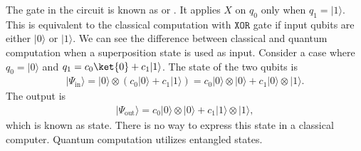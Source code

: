 \documentclass[letterpaper,10pt,english]{jupyterBook}
\begin{document}
\sphinxAtStartPar
The gate in the circuit is known as  or .  It applies \(X\) on \(q_0\) only when \(q_1 = \lvert 1 \rangle\). This is equivalent to the classical computation with \(\texttt{XOR}\) gate if input qubits are either \(\lvert 0 \rangle\) or \(\lvert 1 \rangle\).   We can see the difference between classical and quantum computation  when a superposition state is used as input. Consider a case where \(q_0=\lvert 0 \rangle\) and \(q_1=c_0 \ket{0} + c_1 \lvert 1 \rangle\).  The state of the two qubits is
\begin{equation*}
\begin{split}
\lvert \Psi_\text{in} \rangle = \lvert 0 \rangle \otimes (c_0 \lvert 0 \rangle + c_1 \lvert 1 \rangle) = c_0 \lvert 0 \rangle\otimes \lvert 0 \rangle + c_1 \lvert 0 \rangle \otimes \lvert 1 \rangle.
\end{split}
\end{equation*}
\sphinxAtStartPar
The output is
\begin{equation*}
\begin{split}
\lvert \Psi_\text{out} \rangle =  c_0 \lvert 0 \rangle \otimes \lvert 0 \rangle + c_1 \lvert 1 \rangle \otimes \lvert 1 \rangle,
\end{split}
\end{equation*}
\sphinxAtStartPar
which is known as   state.   There is no way to express this state in a classical computer.  Quantum computation utilizes entangled states.
\end{document}
